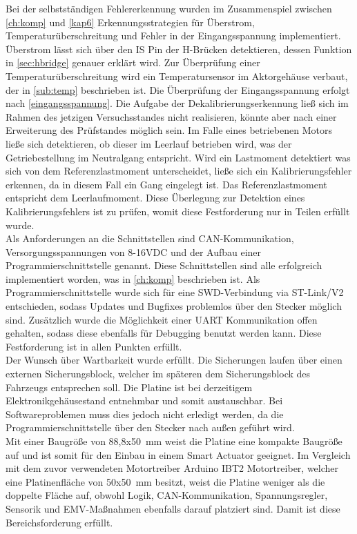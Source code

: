 Bei der selbstständigen Fehlererkennung wurden im Zusammenspiel zwischen \autoref{ch:komp} und \autoref{kap6} Erkennungsstrategien für Überstrom, Temperaturüberschreitung und Fehler in der Eingangsspannung implementiert. Überstrom lässt sich über den IS Pin der H-Brücken detektieren, dessen Funktion in \autoref{sec:hbridge} genauer erklärt wird. Zur Überprüfung einer Temperaturüberschreitung wird ein Temperatursensor im Aktorgehäuse verbaut, der in \autoref{sub:temp} beschrieben ist. Die Überprüfung der Eingangsspannung erfolgt nach \autoref{eingangsspannung}. Die Aufgabe der Dekalibrierungserkennung ließ sich im Rahmen des jetzigen Versuchsstandes nicht realisieren, könnte aber nach einer Erweiterung des Prüfstandes möglich sein. Im Falle eines betriebenen Motors ließe sich detektieren, ob dieser im Leerlauf betrieben wird, was der Getriebestellung im Neutralgang entspricht. Wird ein Lastmoment detektiert was sich von dem Referenzlastmoment unterscheidet, ließe sich ein Kalibrierungsfehler erkennen, da in diesem Fall ein Gang eingelegt ist. Das Referenzlastmoment entspricht dem Leerlaufmoment. Diese Überlegung zur Detektion eines Kalibrierungsfehlers ist zu prüfen, womit diese Festforderung nur in Teilen erfüllt wurde.\\
Als Anforderungen an die Schnittstellen sind CAN-Kommunikation, Versorgungsspannungen von 8-16VDC und der Aufbau einer Programmierschnittstelle genannt. Diese Schnittstellen sind alle erfolgreich implementiert worden, was in \autoref{ch:komp} beschrieben ist. Als Programmierschnittstelle wurde sich für eine SWD-Verbindung via ST-Link/V2 entschieden, sodass Updates und Bugfixes problemlos über den Stecker möglich sind. Zusätzlich wurde die Möglichkeit einer UART Kommunikation offen gehalten, sodass diese ebenfalls für Debugging benutzt werden kann. Diese Festforderung ist in allen Punkten erfüllt.\\
Der Wunsch über Wartbarkeit wurde erfüllt. Die Sicherungen laufen über einen externen Sicherungsblock, welcher im späteren dem Sicherungsblock des Fahrzeugs entsprechen soll. Die Platine ist bei derzeitigem Elektronikgehäusestand entnehmbar und somit austauschbar. Bei Softwareproblemen muss dies jedoch nicht erledigt werden, da die Programmierschnittstelle über den Stecker nach außen geführt wird. \\
Mit einer Baugröße von 88,8x\SI{50}{mm} weist die Platine eine kompakte Baugröße auf und ist somit für den Einbau in einem Smart Actuator geeignet. Im Vergleich mit dem zuvor verwendeten Motortreiber Arduino IBT2 Motortreiber, welcher eine Platinenfläche von 50x\SI{50}{mm} besitzt, weist die Platine weniger als die doppelte Fläche auf, obwohl Logik, CAN-Kommunikation, Spannungsregler, Sensorik und EMV-Maßnahmen ebenfalls darauf platziert sind. Damit ist diese Bereichsforderung erfüllt. \\
